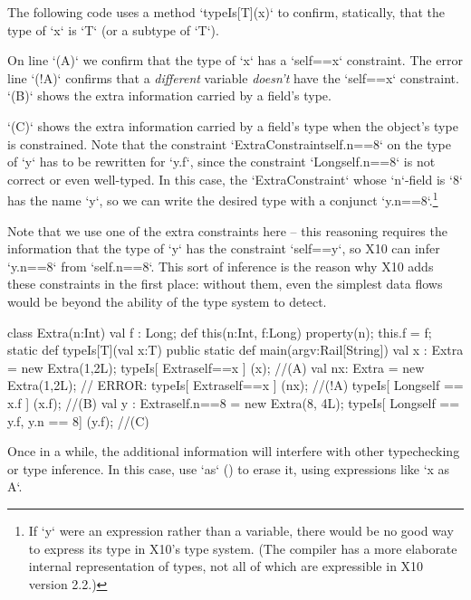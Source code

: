 \begin{ex}

The following code uses a method \xcd`typeIs[T](x)` to confirm, statically,
that the type of \xcd`x` is \xcd`T` (or a subtype of \xcd`T`).  

On line \xcd`(A)` we confirm that the type of \xcd`x` has 
a \xcd`self==x` constraint.  The error line \xcd`(!A)` confirms
that a {\em different} variable {\em doesn't} have the \xcd`self==x`
constraint. \xcd`(B)` shows the extra information carried by a field's type.

\xcd`(C)` shows the extra information carried by a field's type when the
object's type is constrained. Note that the constraint
\xcd`ExtraConstraint{self.n==8}` on the type of \xcd`y` has to be rewritten
for \xcd`y.f`, since the constraint \xcd`Long{self.n==8}` is not correct or
even well-typed. In this case, the \xcd`ExtraConstraint` whose \xcd`n`-field
is \xcd`8` has the name \xcd`y`, so we can write the desired type with a
conjunct \xcd`y.n==8`.\footnote{If \xcd`y` were an expression rather than a
variable, there would be no good way to express its type in X10's type system. 
(The compiler has a more elaborate internal representation of types, not all
of which are expressible in X10 version 2.2.)}

Note that we use one of the extra constraints here -- this reasoning requires
the information that the type of \xcd`y` has the constraint \xcd`self==y`, so
X10 can infer \xcd`y.n==8` from \xcd`self.n==8`. This sort of inference is the
reason why X10 adds these constraints in the first place: without them, even
the simplest data flows would be beyond the ability of the type system to detect.

\begin{xten}
class Extra(n:Int) {
  val f : Long;
  def this(n:Int, f:Long) { property(n); this.f = f; }
  static def typeIs[T](val x:T) {}
  public static def main(argv:Rail[String]) {
     val x : Extra = new Extra(1,2L);
     typeIs[ Extra{self==x} ]   (x);    //(A)
     val nx: Extra = new Extra(1,2L);
     // ERROR: typeIs[ Extra{self==x} ]   (nx); //(!A)
     typeIs[ Long{self == x.f} ]          (x.f);  //(B)
     val y : Extra{self.n==8} = new Extra(8, 4L);
     typeIs[ Long{self == y.f, y.n == 8}] (y.f);  //(C)
  }
}
\end{xten}
%
\end{ex}

Once in a while, the additional information will interfere with other
typechecking or type inference.  In this case, use \xcd`as`
() to erase it, using expressions like \xcd`x as A`.

